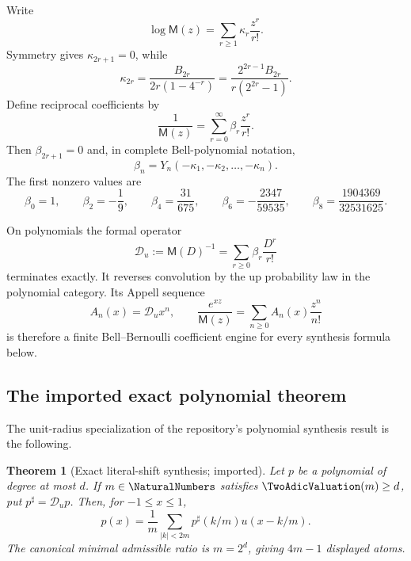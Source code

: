 \documentclass[11pt,oneside]{article}
\numberwithin{equation}{section}
\newtheorem{theorem}{Theorem}[section]
\theoremstyle{definition}
\theoremstyle{remark}
\newcommand{\MM}{\mathsf M}
\newcommand{\Dscr}{\mathscr D_u}
\begin{document}
Write
\begin{equation}
 \log\MM(z)=\sum_{r\ge1}\kappa_r\frac{z^r}{r!}.
 \label{eq:cumulant-def}
\end{equation}
Symmetry gives $\kappa_{2r+1}=0$, while
\begin{equation}
 \kappa_{2r}=\frac{B_{2r}}{2r(1-4^{-r})}
 =\frac{2^{2r-1}B_{2r}}{r(2^{2r}-1)}.
 \label{eq:cumulants}
\end{equation}
Define reciprocal coefficients by
\begin{equation}
 \frac1{\MM(z)}=\sum_{r=0}^{\infty}\beta_r\frac{z^r}{r!}.
 \label{eq:beta-def}
\end{equation}
Then $\beta_{2r+1}=0$ and, in complete Bell-polynomial notation,
\begin{equation}
 \beta_n=Y_n(-\kappa_1,-\kappa_2,\ldots,-\kappa_n).
 \label{eq:beta-bell}
\end{equation}
The first nonzero values are
\begin{equation}
 \beta_0=1,\qquad
 \beta_2=-\frac19,\qquad
 \beta_4=\frac{31}{675},\qquad
 \beta_6=-\frac{2347}{59535},\qquad
 \beta_8=\frac{1904369}{32531625}.
 \label{eq:beta-first}
\end{equation}

On polynomials the formal operator
\begin{equation}
 \Dscr:=\MM(D)^{-1}
 =\sum_{r\ge0}\beta_r\frac{D^r}{r!}
 \label{eq:deconvolution}
\end{equation}
terminates exactly.  It reverses convolution by the up probability law in the
polynomial category.  Its Appell sequence
\begin{equation}
 A_n(x)=\Dscr x^n,
 \qquad
 \frac{e^{xz}}{\MM(z)}=\sum_{n\ge0}A_n(x)\frac{z^n}{n!}
 \label{eq:appell}
\end{equation}
is therefore a finite Bell--Bernoulli coefficient engine for every synthesis
formula below.

\subsection{The imported exact polynomial theorem}

The unit-radius specialization of the repository's polynomial synthesis
result is the following.

\begin{theorem}[Exact literal-shift synthesis; imported]
\label{thm:generic-synthesis}
Let $p$ be a polynomial of degree at most $d$.  If $m\in\NaturalNumbers$ satisfies
$\TwoAdicValuation(m)\ge d$, put $p^\sharp=\Dscr p$.  Then, for $-1\le x\le1$,
\begin{equation}
 \boxed{
 p(x)=\frac1m\sum_{|k|<2m}p^\sharp(k/m)u(x-k/m).}
 \label{eq:generic-synthesis}
\end{equation}
The canonical minimal admissible ratio is $m=2^d$, giving $4m-1$ displayed
atoms.
\end{theorem}
\end{document}
